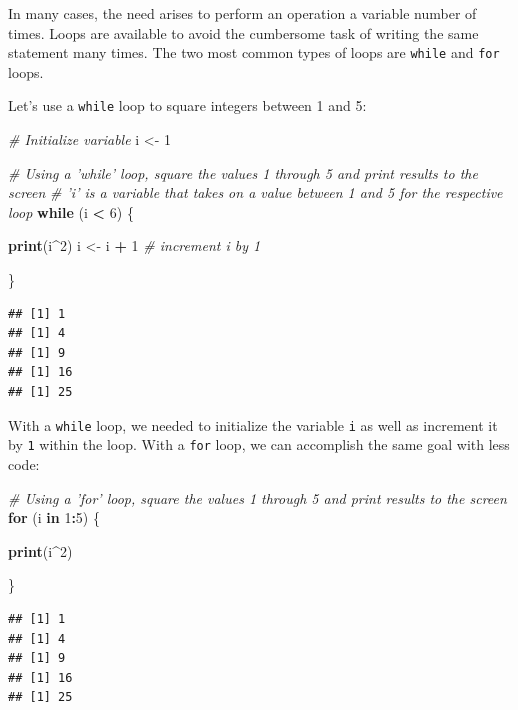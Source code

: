 \documentclass[]{book}
\newenvironment{Shaded}{\begin{snugshade}}{\end{snugshade}}
\newcommand{\CommentTok}[1]{\textcolor[rgb]{0.56,0.35,0.01}{\textit{#1}}}
\newcommand{\ControlFlowTok}[1]{\textcolor[rgb]{0.13,0.29,0.53}{\textbf{#1}}}
\newcommand{\DecValTok}[1]{\textcolor[rgb]{0.00,0.00,0.81}{#1}}
\newcommand{\KeywordTok}[1]{\textcolor[rgb]{0.13,0.29,0.53}{\textbf{#1}}}
\newcommand{\NormalTok}[1]{#1}
\newcommand{\OperatorTok}[1]{\textcolor[rgb]{0.81,0.36,0.00}{\textbf{#1}}}
\newcommand{\StringTok}[1]{\textcolor[rgb]{0.31,0.60,0.02}{#1}}
\begin{document}
In many cases, the need arises to perform an operation a variable number of times. Loops are available to avoid the cumbersome task of writing the same statement many times. The two most common types of loops are \texttt{while} and \texttt{for} loops.

Let's use a \texttt{while} loop to square integers between 1 and 5:

\begin{Shaded}
\begin{Highlighting}[]
\CommentTok{# Initialize variable}
\NormalTok{i <-}\StringTok{ }\DecValTok{1}

\CommentTok{# Using a 'while' loop, square the values 1 through 5 and print results to the screen}
\CommentTok{# 'i' is a variable that takes on a value between 1 and 5 for the respective loop}
\ControlFlowTok{while}\NormalTok{ (i }\OperatorTok{<}\StringTok{ }\DecValTok{6}\NormalTok{) \{}
  
  \KeywordTok{print}\NormalTok{(i}\OperatorTok{^}\DecValTok{2}\NormalTok{) }
\NormalTok{  i <-}\StringTok{ }\NormalTok{i }\OperatorTok{+}\StringTok{ }\DecValTok{1} \CommentTok{# increment i by 1}
  
\NormalTok{\}}
\end{Highlighting}
\end{Shaded}

\begin{verbatim}
## [1] 1
## [1] 4
## [1] 9
## [1] 16
## [1] 25
\end{verbatim}

With a \texttt{while} loop, we needed to initialize the variable \texttt{i} as well as increment it by \texttt{1} within the loop. With a \texttt{for} loop, we can accomplish the same goal with less code:

\begin{Shaded}
\begin{Highlighting}[]
\CommentTok{# Using a 'for' loop, square the values 1 through 5 and print results to the screen}
\ControlFlowTok{for}\NormalTok{ (i }\ControlFlowTok{in} \DecValTok{1}\OperatorTok{:}\DecValTok{5}\NormalTok{) \{ }
  
  \KeywordTok{print}\NormalTok{(i}\OperatorTok{^}\DecValTok{2}\NormalTok{)}
  
\NormalTok{\}}
\end{Highlighting}
\end{Shaded}

\begin{verbatim}
## [1] 1
## [1] 4
## [1] 9
## [1] 16
## [1] 25
\end{verbatim}
\end{document}
